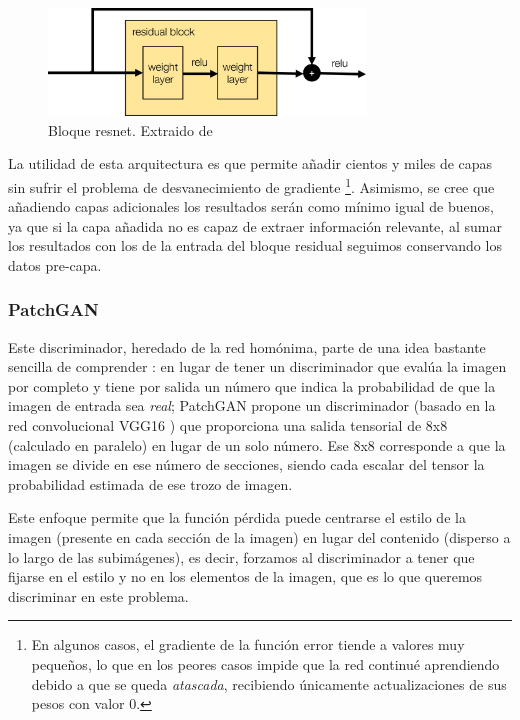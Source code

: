 \documentclass[../main.tex]{subfiles}
\begin{document}
\begin{figure}[h]
    \centering
    \includegraphics[width=0.75\textwidth]{imagenes/bloque_resnet.png}
    \caption[Bloque resnet]{Bloque resnet. Extraido de \cite{Foster2019}}
    \label{fig:bloque_residual}
\end{figure}

La utilidad de esta arquitectura es que permite añadir cientos y miles de capas sin sufrir el problema de desvanecimiento de gradiente \footnote{En algunos casos, el gradiente de la función error tiende a valores muy pequeños, lo que en los peores casos impide que la red continué aprendiendo debido a que se queda \textit{atascada}, recibiendo únicamente actualizaciones de sus pesos con valor 0.}. Asimismo, se cree que añadiendo capas adicionales los resultados serán como mínimo igual de buenos, ya que si la capa añadida no es capaz de extraer información relevante, al sumar los resultados con los de la entrada del bloque residual seguimos conservando los datos pre-capa.

\subsubsection{PatchGAN}

Este discriminador, heredado de la red homónima, parte de una idea bastante sencilla de comprender \cite{Foster2019}: en lugar de tener un discriminador que evalúa la imagen por completo y tiene por salida un número que indica la probabilidad de que la imagen de entrada sea \textit{real}; PatchGAN propone un discriminador \cite{Assens} (basado en la red convolucional VGG16 \cite{Neurohive2018}) que proporciona una salida tensorial de 8x8 (calculado en paralelo) en lugar de un solo número. Ese 8x8 corresponde a que la imagen se divide en ese número de secciones, siendo cada escalar del tensor la probabilidad estimada de ese trozo de imagen. \newline

Este enfoque permite que la función pérdida puede centrarse el estilo de la imagen (presente en cada sección de la imagen) en lugar del contenido (disperso a lo largo de las subimágenes), es decir, forzamos al discriminador a tener que fijarse en el estilo y no en los elementos de la imagen, que es lo que queremos discriminar en este problema.
\end{document}
